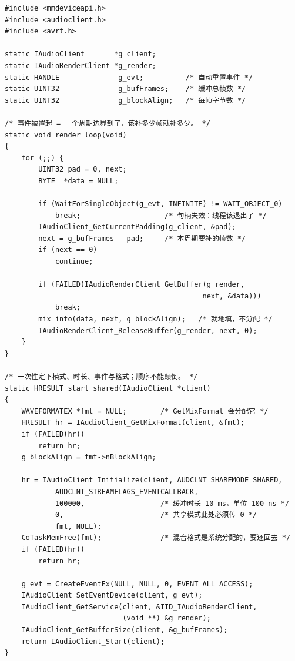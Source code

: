 \documentclass[12pt,a4paper,fontset=fandol]{ctexbook}
\begin{document}
\begin{lstlisting}[style=cstyle,
  caption={WASAPI 共享模式的事件驱动渲染循环骨架（省略错误处理与混音实现）},
  label={lst:ch03-wasapi}]
#include <mmdeviceapi.h>
#include <audioclient.h>
#include <avrt.h>

static IAudioClient       *g_client;
static IAudioRenderClient *g_render;
static HANDLE              g_evt;          /* 自动重置事件 */
static UINT32              g_bufFrames;    /* 缓冲总帧数 */
static UINT32              g_blockAlign;   /* 每帧字节数 */

/* 事件被置起 = 一个周期边界到了，该补多少帧就补多少。 */
static void render_loop(void)
{
    for (;;) {
        UINT32 pad = 0, next;
        BYTE  *data = NULL;

        if (WaitForSingleObject(g_evt, INFINITE) != WAIT_OBJECT_0)
            break;                    /* 句柄失效：线程该退出了 */
        IAudioClient_GetCurrentPadding(g_client, &pad);
        next = g_bufFrames - pad;     /* 本周期要补的帧数 */
        if (next == 0)
            continue;

        if (FAILED(IAudioRenderClient_GetBuffer(g_render,
                                               next, &data)))
            break;
        mix_into(data, next, g_blockAlign);   /* 就地填，不分配 */
        IAudioRenderClient_ReleaseBuffer(g_render, next, 0);
    }
}

/* 一次性定下模式、时长、事件与格式；顺序不能颠倒。 */
static HRESULT start_shared(IAudioClient *client)
{
    WAVEFORMATEX *fmt = NULL;        /* GetMixFormat 会分配它 */
    HRESULT hr = IAudioClient_GetMixFormat(client, &fmt);
    if (FAILED(hr))
        return hr;
    g_blockAlign = fmt->nBlockAlign;

    hr = IAudioClient_Initialize(client, AUDCLNT_SHAREMODE_SHARED,
            AUDCLNT_STREAMFLAGS_EVENTCALLBACK,
            100000,                  /* 缓冲时长 10 ms，单位 100 ns */
            0,                       /* 共享模式此处必须传 0 */
            fmt, NULL);
    CoTaskMemFree(fmt);              /* 混音格式是系统分配的，要还回去 */
    if (FAILED(hr))
        return hr;

    g_evt = CreateEventEx(NULL, NULL, 0, EVENT_ALL_ACCESS);
    IAudioClient_SetEventDevice(client, g_evt);
    IAudioClient_GetService(client, &IID_IAudioRenderClient,
                            (void **) &g_render);
    IAudioClient_GetBufferSize(client, &g_bufFrames);
    return IAudioClient_Start(client);
}
\end{lstlisting}
\end{document}
